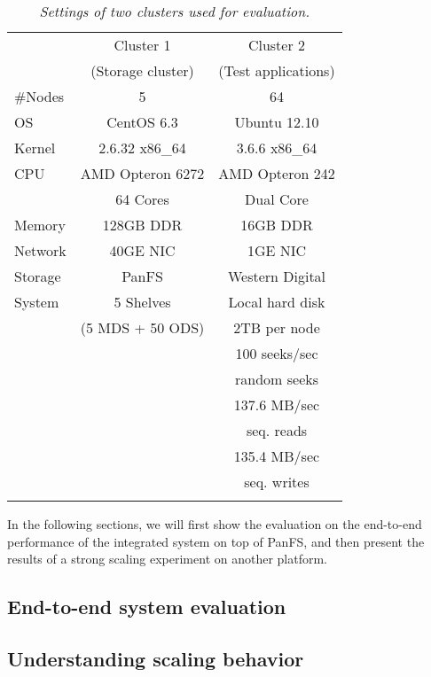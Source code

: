 \begin{footnotesize}
\begin{table}
\begin{tabular}{lcc}
\toprule
      & Cluster 1 & Cluster 2 \\
      & (Storage cluster) & (Test applications)\\
\midrule
\#Nodes & 5 & 64 \\
\hline
OS &   CentOS 6.3 &  Ubuntu 12.10 \\
Kernel & 2.6.32 x86\_64 & 3.6.6 x86\_64 \\
\hline
CPU & AMD Opteron 6272 &  AMD Opteron 242 \\
    & 64 Cores & Dual Core\\
\hline
Memory & 128GB DDR &  16GB DDR \\
\hline
Network & 40GE NIC &  1GE NIC  \\
\hline
Storage & PanFS & Western Digital \\
System &      5 Shelves & Local hard disk  \\
       &   (5 MDS + 50 ODS) &  2TB per node  \\
\hline
& & 100 seeks/sec \\
& & random seeks   \\
& & 137.6 MB/sec  \\
& & seq. reads    \\
& & 135.4 MB/sec  \\
& & seq. writes   \\
\bottomrule \\
\end{tabular}
\caption{
\textit{\footnotesize Settings of two clusters used for evaluation.}
}
\label{tab:setting}
\end{table}
\end{footnotesize}

In the following sections, we will first show the evaluation
on the end-to-end performance of the integrated system on top of PanFS,
and then present the results of a strong scaling experiment on another platform.

\subsection{End-to-end system evaluation}
\label{sec:fullsystem}


\subsection{Understanding scaling behavior}

